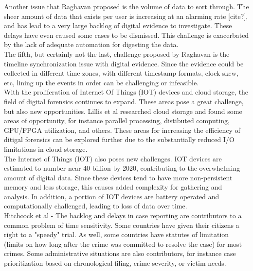 \documentclass[12pt]{article}
\begin{document}
Another issue that Raghavan\cite{raghavan2013digital} proposed is the volume of data to sort through.  The sheer
amount of data that exists per user is increasing at an alarming rate [cite?], and has lead to a very large
backlog of digital evidence to investigate.  These delays have even caused some cases to be dismissed.  This
challenge is exacerbated by the lack of adequate automation for digesting the data.\\

The fifth, but certainly not the last, challenge proposed by Raghavan\cite{raghavan2013digital} is the timeline
synchronization issue with digital evidence.  Since the evidence could be collected in different time zones, 
with different timestamp formats, clock skew, etc, lining up the events in order can be challenging or
infeasible.\\

With the proliferation of Internet Of Things (IOT) devices and cloud storage, the field of digital forensics
continues to expand.  These areas pose a great challenge, but also new opportunities.  Lillis et
al\cite{lillis2016current} researched cloud storage and found some areas of opportunity, for instance parallel
processing, distibuted computing, GPU/FPGA utilization, and others.  These areas for increasing the efficiency
of ditigal forensics can be explored further due to the substantially reduced I/O limitations in cloud storage.\\

The Internet of Things (IOT) also poses new challenges.  IOT devices are estimated to number near 40 billion by
2020, contributing to the overwhelming amount of digital data.  Since these devices tend to have more 
non-persistent memory and less storage, this causes added complexity for gathering and analysis.  In addition,
a portion of IOT devices are battery operated and computationally challenged, leading to loss of data over
time.\\

Hitchcock et al\cite{hitchcock2016tiered} - The backlog and delays in case reporting are contributors to a common problem of time sensitivity.  Some countries 
have given their citizens a right to a "speedy" trial.  As well, some countries have statutes of limitation (limits
on how long after the crime was committed to resolve the case) for most crimes.  Some administrative situations are
also contributors, for instance case prioritization based on chronological filing, crime severity, or victim needs.\\
\end{document}
